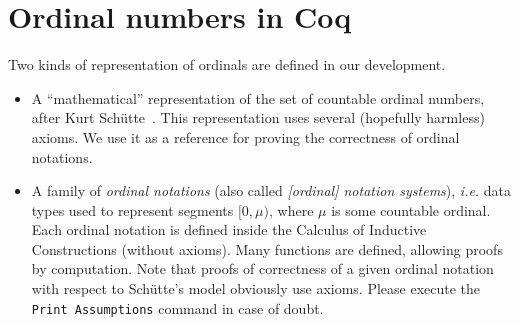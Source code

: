 \section{Ordinal numbers in Coq}

Two kinds of representation of ordinals are defined in our development.

\begin{itemize}
\item A ``mathematical'' representation of the set of countable ordinal numbers, after Kurt Schütte~\cite{schutte}. This representation uses several (hopefully harmless) axioms. We use it as a reference for proving the correctness of ordinal notations.
\item A family of \emph{ordinal notations} (also called \emph{[ordinal] notation systems}), \emph{i.e.} data types used to represent segments $[0,\mu)$, where $\mu$ is some countable ordinal. Each ordinal notation is defined inside the Calculus of Inductive Constructions (without axioms). Many functions are defined, allowing proofs by computation. Note that proofs of 
correctness of a given ordinal notation with respect to Schütte's model obviously use axioms.
Please execute the \texttt{Print Assumptions} command in case of doubt.
\end{itemize}





